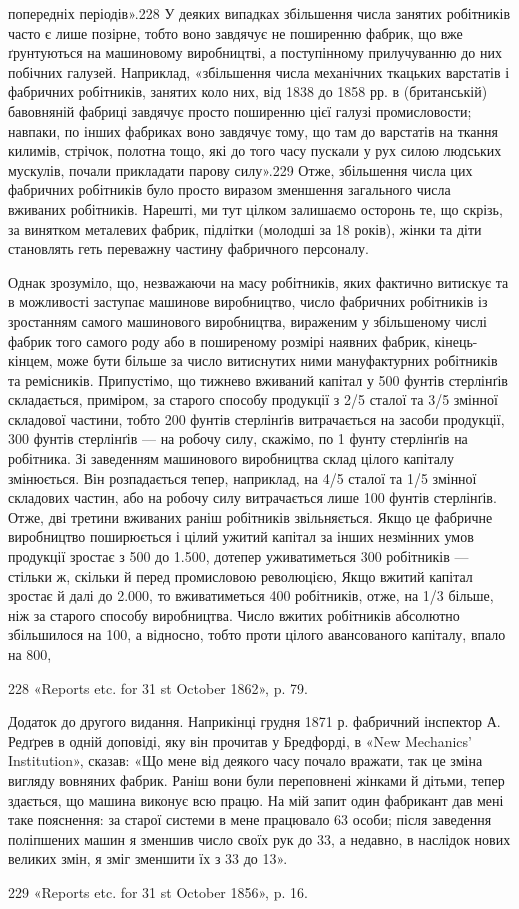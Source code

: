 попередніх періодів».228 У деяких випадках збільшення числа
занятих робітників часто є лише позірне, тобто воно завдячує не
поширенню фабрик, що вже ґрунтуються на машиновому виробництві,
а поступінному прилучуванню до них побічних галузей.
Наприклад, «збільшення числа механічних ткацьких варстатів
і фабричних робітників, занятих коло них, від 1838 до 1858 рр.
в (британській) бавовняній фабриці завдячує просто поширенню
цієї галузі промисловости; навпаки, по інших фабриках воно
завдячує тому, що там до варстатів на ткання килимів, стрічок,
полотна тощо, які до того часу пускали у рух силою людських
мускулів, почали прикладати парову силу».229 Отже, збільшення
числа цих фабричних робітників було просто виразом зменшення
загального числа вживаних робітників. Нарешті, ми тут цілком
залишаємо осторонь те, що скрізь, за винятком металевих фабрик,
підлітки (молодші за 18 років), жінки та діти становлять геть
переважну частину фабричного персоналу.

Однак зрозуміло, що, незважаючи на масу робітників, яких фактично
витискує та в можливості заступає машинове виробництво,
число фабричних робітників із зростанням самого машинового виробництва,
вираженим у збільшеному числі фабрик того самого
роду або в поширеному розмірі наявних фабрик, кінець-кінцем,
може бути більше за число витиснутих ними мануфактурних робітників
та ремісників. Припустімо, що тижнево вживаний капітал
у 500 фунтів стерлінґів складається, приміром, за старого способу
продукції з 2/5 сталої та 3/5 змінної складової частини, тобто 200
фунтів стерлінґів витрачається на засоби продукції, 300 фунтів
стерлінґів — на робочу силу, скажімо, по 1 фунту стерлінґів
на робітника. Зі заведенням машинового виробництва склад цілого
капіталу змінюється. Він розпадається тепер, наприклад, на 4/5
сталої та 1/5 змінної складових частин, або на робочу силу витрачається
лише 100 фунтів стерлінґів. Отже, дві третини вживаних
раніш робітників звільняється. Якщо це фабричне виробництво
поширюється і цілий ужитий капітал за інших незмінних умов
продукції зростає з 500 до 1.500, дотепер уживатиметься 300 робітників
— стільки ж, скільки й перед промисловою революцією,
Якщо вжитий капітал зростає й далі до 2.000, то вживатиметься
400 робітників, отже, на 1/3 більше, ніж за старого способу виробництва.
Число вжитих робітників абсолютно збільшилося на 100,
а відносно, тобто проти цілого авансованого капіталу, впало на 800,

228 «Reports etc. for 31 st October 1862», p. 79.

Додаток до другого видання. Наприкінці грудня 1871 р. фабричний
інспектор А. Редґрев в одній доповіді, яку він прочитав у Бредфорді, в
«New Mechanics’ Institution», сказав: «Що мене від деякого часу почало
вражати, так це зміна вигляду вовняних фабрик. Раніш вони були переповнені
жінками й дітьми, тепер здається, що машина виконує всю працю.
На мій запит один фабрикант дав мені таке пояснення: за старої системи в
мене працювало 63 особи; після заведення поліпшених машин я зменшив
число своїх рук до 33, а недавно, в наслідок нових великих змін, я зміг
зменшити їх з 33 до 13».

229 «Reports etc. for 31 st October 1856», p. 16.
